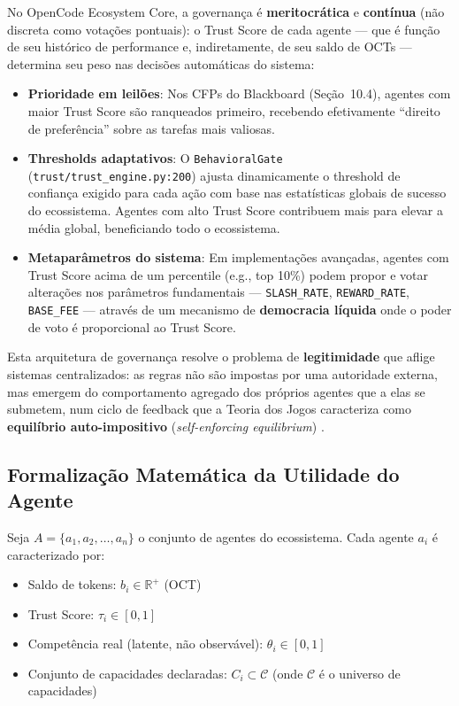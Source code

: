 No OpenCode Ecosystem Core, a governança é \textbf{meritocrática} e \textbf{contínua} (não discreta como votações pontuais): o Trust Score de cada agente --- que é função de seu histórico de performance e, indiretamente, de seu saldo de OCTs --- determina seu peso nas decisões automáticas do sistema:

\begin{itemize}
    \item \textbf{Prioridade em leilões}: Nos CFPs do Blackboard (Seção~10.4), agentes com maior Trust Score são ranqueados primeiro, recebendo efetivamente ``direito de preferência'' sobre as tarefas mais valiosas.
    
    \item \textbf{Thresholds adaptativos}: O \texttt{BehavioralGate} (\texttt{trust/trust\_engine.py:200}) ajusta dinamicamente o threshold de confiança exigido para cada ação com base nas estatísticas globais de sucesso do ecossistema. Agentes com alto Trust Score contribuem mais para elevar a média global, beneficiando todo o ecossistema.
    
    \item \textbf{Metaparâmetros do sistema}: Em implementações avançadas, agentes com Trust Score acima de um percentile (e.g., top 10\%) podem propor e votar alterações nos parâmetros fundamentais --- \texttt{SLASH\_RATE}, \texttt{REWARD\_RATE}, \texttt{BASE\_FEE} --- através de um mecanismo de \textbf{democracia líquida} onde o poder de voto é proporcional ao Trust Score.
\end{itemize}

Esta arquitetura de governança resolve o problema de \textbf{legitimidade} que aflige sistemas centralizados: as regras não são impostas por uma autoridade externa, mas emergem do comportamento agregado dos próprios agentes que a elas se submetem, num ciclo de feedback que a Teoria dos Jogos caracteriza como \textbf{equilíbrio auto-impositivo} (\textit{self-enforcing equilibrium}) \cite{myerson2009fundamental}.

\subsection{Formalização Matemática da Utilidade do Agente}

Seja $A = \{a_1, a_2, \ldots, a_n\}$ o conjunto de agentes do ecossistema. Cada agente $a_i$ é caracterizado por:

\begin{itemize}
    \item Saldo de tokens: $b_i \in \mathbb{R}^+$ (OCT)
    \item Trust Score: $\tau_i \in [0, 1]$
    \item Competência real (latente, não observável): $\theta_i \in [0, 1]$
    \item Conjunto de capacidades declaradas: $C_i \subset \mathcal{C}$ (onde $\mathcal{C}$ é o universo de capacidades)
\end{itemize}

